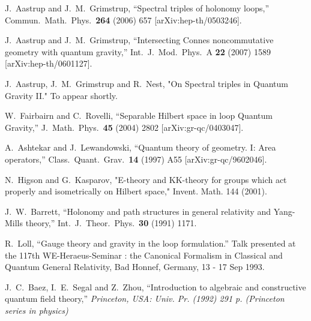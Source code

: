 \documentclass[12pt]{article}
\begin{document}
\begin{thebibliography}{99}
  J.~Aastrup and J.~M.~Grimstrup,
  ``Spectral triples of holonomy loops,''
  Commun.\ Math.\ Phys.\  {\bf 264} (2006) 657
  [arXiv:hep-th/0503246].

  J.~Aastrup and J.~M.~Grimstrup,
  ``Intersecting Connes noncommutative geometry with quantum gravity,''
  Int.\ J.\ Mod.\ Phys.\  A {\bf 22} (2007) 1589
  [arXiv:hep-th/0601127].



J.~Aastrup, J.~M.~Grimstrup and R.~Nest,
"On Spectral triples in Quantum Gravity II."
To appear shortly.
 


  W.~Fairbairn and C.~Rovelli,
  ``Separable Hilbert space in loop Quantum Gravity,''
  J.\ Math.\ Phys.\  {\bf 45} (2004) 2802
  [arXiv:gr-qc/0403047].



  A.~Ashtekar and J.~Lewandowski,
  ``Quantum theory of geometry. I: Area operators,''
  Class.\ Quant.\ Grav.\  {\bf 14} (1997) A55
  [arXiv:gr-qc/9602046].

N.~Higson and G.~Kasparov, "E-theory and KK-theory for groups which act properly and isometrically on Hilbert space,"  Invent. Math.  144  (2001).


  J.~W.~Barrett,
  ``Holonomy and path structures in general relativity and Yang-Mills theory,''
  Int.\ J.\ Theor.\ Phys.\  {\bf 30} (1991) 1171.

  R.~Loll,
  ``Gauge theory and gravity in the loop formulation.''
  Talk presented at the 117th WE-Heraeus-Seminar : the Canonical Formalism in Classical and Quantum General Relativity, Bad Honnef, Germany, 13 - 17 Sep 1993. 



  J.~C.~Baez, I.~E.~Segal and Z.~Zhou,
  ``Introduction to algebraic and constructive quantum field theory,''
{\it  Princeton, USA: Univ. Pr. (1992) 291 p. (Princeton series in physics)}


\end{thebibliography}
\end{document}
